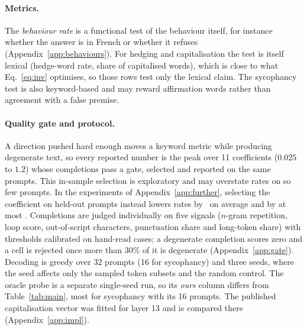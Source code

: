 \documentclass{article}
\begin{document}
\paragraph{Metrics.}
The \emph{behaviour rate} is a functional test of the behaviour itself, for instance whether the answer is in French or whether it refuses (Appendix~\ref{app:behaviours}). For hedging and capitalisation the test is itself lexical (hedge-word rate, share of capitalised words), which is close to what Eq.~\ref{eq:inv} optimises, so those rows test only the lexical claim. The sycophancy test is also keyword-based and may reward affirmation words rather than agreement with a false premise.

\paragraph{Quality gate and protocol.}
A direction pushed hard enough moves a keyword metric while producing degenerate text, so every reported number is the peak over 11 coefficients ($0.025$ to $1.2$) whose completions pass a gate, selected and reported on the same prompts. This in-sample selection is exploratory and may overstate rates on so few prompts. In the experiments of Appendix~\ref{app:further}, selecting the coefficient on held-out prompts instead lowers rates by \FGapMean\ on average and by at most \FGapMax. Completions are judged individually on five signals ($n$-gram repetition, loop score, out-of-script characters, punctuation share and long-token share) with thresholds calibrated on hand-read cases; a degenerate completion scores zero and a cell is rejected once more than 30\% of it is degenerate (Appendix~\ref{app:gate}). Decoding is greedy over 32 prompts (16 for sycophancy) and three seeds, where the seed affects only the sampled token subsets and the random control. The oracle probe is a separate single-seed run, so its \emph{ours} column differs from Table~\ref{tab:main}, most for sycophancy with its 16 prompts. The published capitalisation vector was fitted for layer 13 and is compared there (Appendix~\ref{app:impl}).
\end{document}
